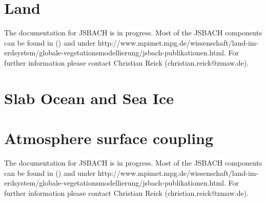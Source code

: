 \documentclass[DIV14,BCOR1cm,11pt,a4paper,twoside]{scrreprt}
\begin{document}
\chapter{Land}
The documentation for JSBACH is in progress. Most of the JSBACH components can be found in (\cite{raddatz2007}) and under http://www.mpimet.mpg.de/wissenschaft/land-im-erdsystem/globale-vegetationsmodellierung/jsbach-publikationen.html. For further information please contact Christian Reick (christian.reick@zmaw.de).

\chapter{Slab Ocean and Sea Ice}






\chapter{Atmosphere surface coupling}
The documentation for JSBACH is in progress. Most of the JSBACH components can be found in (\cite{raddatz2007}) and under http://www.mpimet.mpg.de/wissenschaft/land-im-erdsystem/globale-vegetationsmodellierung/jsbach-publikationen.html. For further information please contact Christian Reick (christian.reick@zmaw.de).







\end{document}
